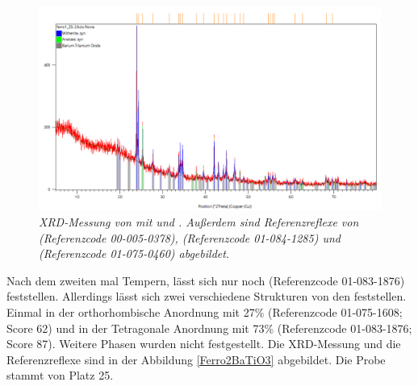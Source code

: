 \documentclass[12pt, a4paper]{article}
\begin{document}
\begin{figure}[!h]
  \begin{center}
   
  \includegraphics[scale=0.5]{Ferro1BaTiO3.png}
\caption{\textit{XRD-Messung von  mit  und . Außerdem sind Referenzreflexe von 
 (Referenzcode 00-005-0378),  (Referenzcode 01-084-1285) und  (Referenzcode 01-075-0460) abgebildet.}}
\label{Ferro1BaTiO3}
 \end{center}
\end{figure}

\noindent
Nach dem zweiten mal Tempern, lässt sich nur noch  (Referenzcode 01-083-1876) feststellen. Allerdings lässt sich zwei 
verschiedene Strukturen von den  feststellen. Einmal in der orthorhombische Anordnung mit 27\% (Referenzcode 01-075-1608; Score 62) und 
in der Tetragonale Anordnung mit 73\% (Referenzcode 01-083-1876; Score 87). Weitere Phasen wurden nicht festgestellt. Die XRD-Messung und die Referenzreflexe sind in
der Abbildung \ref{Ferro2BaTiO3} abgebildet. Die Probe stammt von Platz 25.
\newpage
\end{document}
